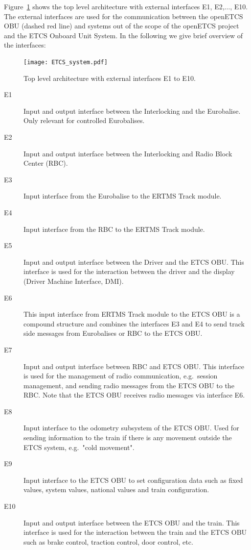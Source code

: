 Figure~\ref{f:top_level} shows the top level architecture with external interfaces E1, E2,$\ldots$, E10. The external interfaces are used for the communication between the openETCS OBU (dashed red line) and systems out of the scope of the openETCS project and the ETCS Onboard Unit System. In the following we give  brief overview of the interfaces:
\begin{figure}
\centering
\texttt{[image: ETCS\_system.pdf]}
\caption{Top level architecture with external interfaces E1 to E10.}
\label{f:top_level}
\end{figure}

\begin{description}
\item[E1] Input and output interface between the Interlocking and the Eurobalise. Only relevant for controlled Eurobalises.

\item[E2] Input and output interface between the Interlocking and Radio Block Center (RBC).

\item[E3] Input interface from the Eurobalise to the ERTMS Track module.

\item[E4] Input interface from the RBC to the ERTMS Track module.

\item[E5]  Input and output interface between the Driver and the ETCS OBU. This interface is used for the interaction between the driver and the display (Driver Machine Interface, DMI).

\item[E6] This input interface from ERTMS Track module to the ETCS OBU is a compound structure and combines the interfaces E3 and E4 to send track side messages from Eurobalises or RBC to the ETCS OBU.

\item[E7] Input and output interface between RBC and ETCS OBU. This interface is used for the management of radio communication, e.g.~session management, and sending radio messages from the ETCS OBU to the RBC. Note that the ETCS OBU receives radio messages via interface E6.

\item[E8] Input interface to the odometry subsystem of the ETCS OBU. Used for sending information to the train if there is any movement outside the ETCS system, e.g.~"cold movement".

\item[E9] Input interface to the ETCS OBU to set configuration data such as fixed values, system values, national values and train configuration.

\item[E10] Input and output interface between the ETCS OBU and the train. This interface is used for the interaction between the train and the ETCS OBU such as brake control, traction control, door control, etc.

\end{description}


